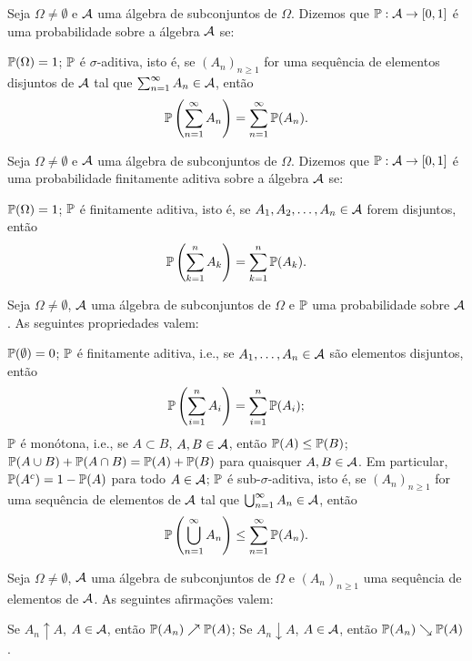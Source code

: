 \begin{definition}[Probabilidade]
	Seja $\Omega \neq \emptyset$ e $\Acal$ uma álgebra de subconjuntos de $\Omega$. Dizemos que $\P : \Acal \to [0,1]$ é uma probabilidade sobre a álgebra $\Acal$ se:
	\begin{outline}[enumerate]
		\1 $\P(\Omega) = 1$;
		\1 $\P$ é $\sigma$-aditiva, isto é, se $(A_n)_{n\geq 1}$ for uma sequência de elementos disjuntos de $\Acal$ tal que $\sum_{n=1}^{\infty} A_n \in \Acal$, então
		\[
		\P\left( \sum_{n=1}^{\infty} A_n \right) = \sum_{n=1}^{\infty} \P(A_n).
		\]
	\end{outline}
\end{definition}

\begin{definition}
	Seja $\Omega \neq \emptyset$ e $\Acal$ uma álgebra de subconjuntos de $\Omega$. Dizemos que $\P : \Acal \to [0,1]$ é uma probabilidade finitamente aditiva sobre a álgebra $\Acal$ se:
	\begin{outline}[enumerate]
		\1 $\P(\Omega) = 1$;
		\1 $\P$ é finitamente aditiva, isto é, se $A_1, A_2, \ldots, A_n \in \Acal$ forem disjuntos, então
		\[
		\P\left( \sum_{k=1}^{n} A_k \right) = \sum_{k=1}^{n} \P(A_k).
		\]
	\end{outline}
\end{definition}

\begin{theorem}
	Seja $\Omega \neq \emptyset$, $\Acal$ uma álgebra de subconjuntos de $\Omega$ e $\P$ uma probabilidade sobre $\Acal$. As seguintes propriedades valem:
	\begin{outline}[enumerate]
		\1 $\P(\emptyset) = 0$;
		\1 $\P$ é finitamente aditiva, i.e., se $A_1, \ldots, A_n \in \Acal$ são elementos disjuntos, então
		\[
		\P\left( \sum_{i=1}^{n} A_i \right) = \sum_{i=1}^{n} \P(A_i);
		\]
		\1 $\P$ é monótona, i.e., se $A \subset B$, $A, B \in \Acal$, então $\P(A) \leq \P(B)$;
		\1 $\P(A \cup B) + \P(A \cap B) = \P(A) + \P(B)$ para quaisquer $A, B \in \Acal$. Em particular, $\P(A^c) = 1 - \P(A)$ para todo $A \in \Acal$;
		\1 $\P$ é sub-$\sigma$-aditiva, isto é, se $(A_n)_{n\geq 1}$ for uma sequência de elementos de $\Acal$ tal que $\bigcup_{n=1}^{\infty} A_n \in \Acal$, então
		\[
		\P\left( \bigcup_{n=1}^{\infty} A_n \right) \leq \sum_{n=1}^{\infty} \P(A_n).
		\]
	\end{outline}
\end{theorem}

\begin{theorem}
	Seja $\Omega \neq \emptyset$, $\Acal$ uma álgebra de subconjuntos de $\Omega$ e $(A_n)_{n\geq 1}$ uma sequência de elementos de $\Acal$. As seguintes afirmações valem:
	\begin{outline}[enumerate]
		\1 Se $A_n \uparrow A$, $A \in \Acal$, então $\P(A_n) \nearrow \P(A)$;
		\1 Se $A_n \downarrow A$, $A \in \Acal$, então $\P(A_n) \searrow \P(A)$.
	\end{outline}
\end{theorem}

